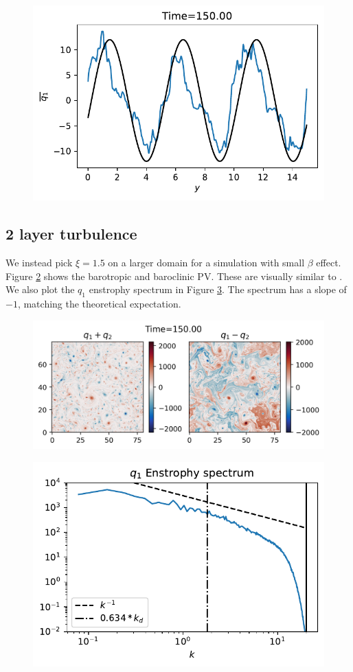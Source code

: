 \begin{figure}
    \centering
    \includegraphics{2Layjets_q1zonalmean_t150d00}
    \caption{}
    \label{fig:2Layjets_q1zonalmean_t150d00}
\end{figure}

\subsection{2 layer turbulence}
We instead pick $\xi=1.5$ on a larger domain for a simulation with small $\beta$ effect. Figure \ref{fig:2Lay_qbrbc_t150d00} shows the barotropic and baroclinic PV. These are visually similar to \cite[Fig. 3]{LarichevHeld_95}. We also plot the $q_1$ enstrophy spectrum in Figure \ref{fig:2Lay_q1spec_t150d00}. The spectrum has a slope of $-1$, matching the theoretical expectation.

\begin{figure}
    \centering
    \includegraphics{2Lay_qbrbc_t150d00}
    \caption{}
    \label{fig:2Lay_qbrbc_t150d00}
\end{figure}

\begin{figure}
    \centering
    \includegraphics{2Lay_q1spec_t150d00}
    \caption{}
    \label{fig:2Lay_q1spec_t150d00}
\end{figure}